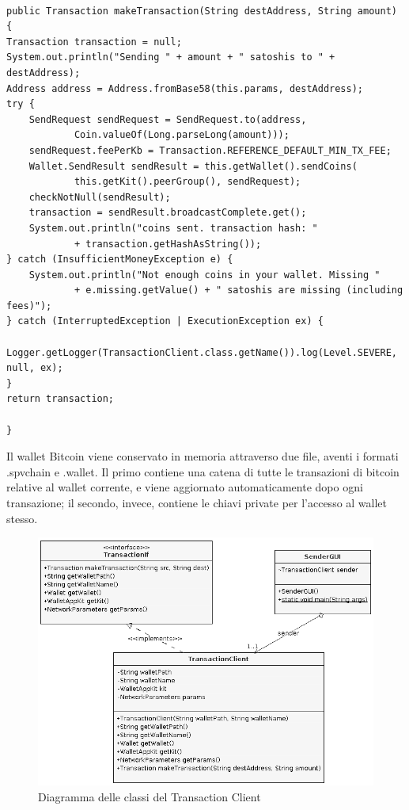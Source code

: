 \begin{lstlisting}[caption={Metodo makeTransaction in TransactionClient.java},label={trxClient},style={c}]

public Transaction makeTransaction(String destAddress, String amount) 
{
Transaction transaction = null;
System.out.println("Sending " + amount + " satoshis to " + destAddress);
Address address = Address.fromBase58(this.params, destAddress);
try {
    SendRequest sendRequest = SendRequest.to(address,
            Coin.valueOf(Long.parseLong(amount)));
    sendRequest.feePerKb = Transaction.REFERENCE_DEFAULT_MIN_TX_FEE;
    Wallet.SendResult sendResult = this.getWallet().sendCoins(
            this.getKit().peerGroup(), sendRequest);
    checkNotNull(sendResult); 
    transaction = sendResult.broadcastComplete.get();
    System.out.println("coins sent. transaction hash: "
            + transaction.getHashAsString());
} catch (InsufficientMoneyException e) {
    System.out.println("Not enough coins in your wallet. Missing "
            + e.missing.getValue() + " satoshis are missing (including fees)");
} catch (InterruptedException | ExecutionException ex) {
    Logger.getLogger(TransactionClient.class.getName()).log(Level.SEVERE, null, ex);
}
return transaction;

}
\end{lstlisting}

Il wallet Bitcoin viene conservato in memoria attraverso due file, aventi i formati .spvchain e .wallet. Il primo contiene una catena di tutte le transazioni di bitcoin relative al wallet corrente, e viene aggiornato automaticamente dopo ogni transazione; il secondo, invece, contiene le chiavi private per l'accesso al wallet stesso.

\begin{figure}[h!t]
\centerline{\includegraphics[scale=2]{img/BlockchainCorrect}}
\caption{Diagramma delle classi del Transaction Client}
\label{f:integr:trxclient}
\end{figure}

